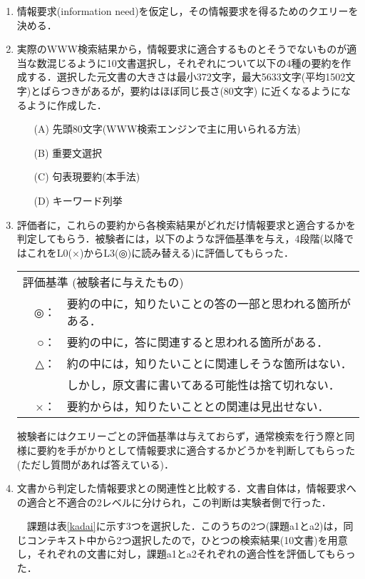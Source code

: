 \begin{enumerate}
 \item 情報要求(information need)を仮定し，その情報要求を得るためのクエリーを決める．
 \item 実際のWWW検索結果から，情報要求に適合するものとそうでないものが適当な数混じるように10文書選択し，それぞれについて以下の4種の要約を作成する．選択した元文書の大きさは最小372文字，最大5633文字(平均1502文字)とばらつきがあるが，要約はほぼ同じ長さ(80文字) に近くなるようになるように作成した．
\begin{enumerate}
 \item[(A)] 先頭80文字(WWW検索エンジンで主に用いられる方法)
 \item[(B)] 重要文選択~\cite{zechner96}
 \item[(C)] 句表現要約(本手法)
 \item[(D)] キーワード列挙
\end{enumerate}
 \item 評価者に，これらの要約から各検索結果がどれだけ情報要求と適合するかを判定してもらう．被験者には，以下のような評価基準を与え，4段階(以降ではこれをL0(×)からL3(◎)に読み替える)に評価してもらった．

\begin{center}
\vspace{0.3cm}
 \begin{tabular}{|p{2em}rl|} \hline
 \multicolumn{3}{|l|}{評価基準 (被験者に与えたもの)} \\
 & ◎： & 要約の中に，知りたいことの答の一部と思われる箇所がある． \\
 & ○： & 要約の中に，答に関連すると思われる箇所がある． \\
 & △： & 約の中には，知りたいことに関連しそうな箇所はない．\\
 & & しかし，原文書に書いてある可能性は捨て切れない． \\
 & ×： & 要約からは，知りたいこととの関連は見出せない．\\ \hline
 \end{tabular}
\vspace{0.3cm}
\end{center}

被験者にはクエリーごとの評価基準は与えておらず，通常検索を行う際と同様に要約を手がかりとして情報要求に適合するかどうかを判断してもらった(ただし質問があれば答えている)．

 \item 文書から判定した情報要求との関連性と比較する．文書自体は，情報要求への適合と不適合の2レベルに分けられ，この判断は実験者側で行った．

　課題は表\ref{kadai}に示す3つを選択した．このうちの2つ(課題a1とa2)は，同じコンテキスト中から2つ選択したので，ひとつの検索結果(10文書)を用意し，それぞれの文書に対し，課題a1とa2それぞれの適合性を評価してもらった．
\end{enumerate}

